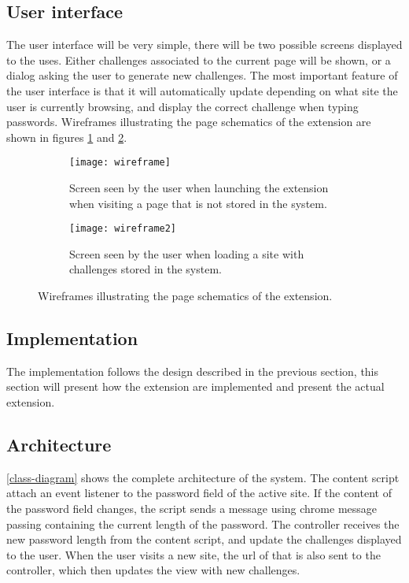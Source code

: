 \subsection{User interface}
The user interface will be very simple, there will be two possible screens displayed to the uses. Either challenges associated to the current page will be shown, or a dialog asking the user to generate new challenges. The most important feature of the user interface is that it will automatically update depending on what site the user is currently browsing, and display the correct challenge when typing passwords. Wireframes illustrating the page schematics of the extension are shown in figures \ref{add-new-screen} and \ref{challenge-screen}.

\begin{figure}[h]
    \centering
    \begin{subfigure}[t]{0.49\textwidth}
        \centering
        \texttt{[image: wireframe]} 
        \caption{Screen seen by the user when launching the extension when visiting a page that is not stored in the system.}
        \label{add-new-screen}
    \end{subfigure}
    \hfill
    \begin{subfigure}[t]{0.49\textwidth}
        \centering
        \texttt{[image: wireframe2]} 
        \caption{Screen seen by the user when loading a site with challenges stored in the system. }
        \label{challenge-screen}
    \end{subfigure}
    \caption{Wireframes illustrating the page schematics of the extension.}
    \label{wireframes}
\end{figure}

\subsection{Implementation}
The implementation follows the design described in the previous section, this section will present how the extension are implemented and present the actual extension.


\subsection{Architecture}
\par \autoref{class-diagram} shows the complete architecture of the system.
 The content script attach an event listener to the password field of the active site. If the content of the password field changes, the script sends a message using chrome message passing containing the current length of the password. The controller receives the new password length from the content script, and update the challenges displayed to the user. When the user visits a new site, the url of that is also sent to the controller, which then updates the view with new challenges. 

